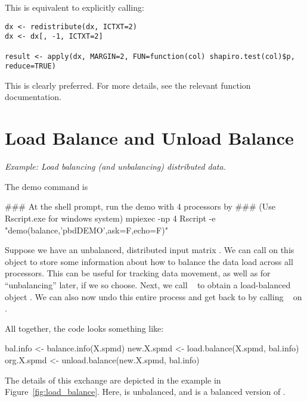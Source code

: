 This is equivalent to explicitly calling:

\begin{lstlisting}[language=rr,title=Implicit Redistributions]
dx <- redistribute(dx, ICTXT=2)
dx <- dx[, -1, ICTXT=2]

result <- apply(dx, MARGIN=2, FUN=function(col) shapiro.test(col)$p, reduce=TRUE)
\end{lstlisting}

This is clearly preferred.  For more details, see the relevant function documentation.




\section[Load Balance and Unload Balance]{Load Balance and Unload Balance}
\label{sec:lb_ub}

\emph{Example:  Load balancing (and unbalancing) distributed data.}

The demo command is
\begin{Command}
### At the shell prompt, run the demo with 4 processors by
### (Use Rscript.exe for windows system)
mpiexec -np 4 Rscript -e "demo(balance,'pbdDEMO',ask=F,echo=F)"
\end{Command}

Suppose we have an unbalanced, distributed input matrix .  We can call  on this object to store some information about how to balance the data load across all processors.  This can be useful for tracking data movement, as well as for ``unbalancing'' later, if we so choose.  Next, we call
~
to obtain a load-balanced object .  We can also now undo this entire process and get back to  by calling
~ on .


All together, the code looks something like:
\begin{Code}[title=R Code]
bal.info <- balance.info(X.spmd)
new.X.spmd <- load.balance(X.spmd, bal.info)
org.X.spmd <- unload.balance(new.X.spmd, bal.info)
\end{Code}

The details of this exchange are depicted in the example in Figure~\ref{fig:load_balance}.  Here, 
 is unbalanced, and  is a balanced version of .

